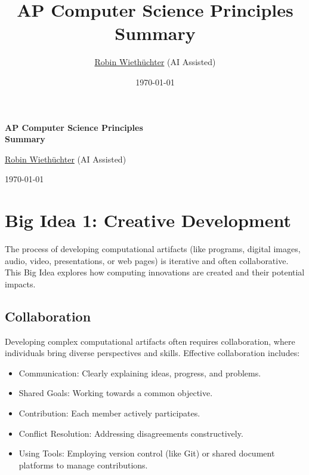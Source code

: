 \documentclass[11pt,oneside]{book}
\title{AP Computer Science Principles \\ Summary}
\author{\href{https://rowi.dev/}{Robin Wiethüchter} (AI Assisted)}
\date{\today}
\begin{document}
\begin{titlepage}
    \centering
    \vspace*{2cm}
    
    {\LARGE\bfseries AP Computer Science Principles \\ Summary\par}
    \vspace{1cm}
    {\large\href{https://rowi.dev/}{Robin Wiethüchter} (AI Assisted)\par}
    \vspace{1cm}
    {\large\today\par}
    
    \vspace{2cm}
    
\end{titlepage}

\frontmatter %
\tableofcontents

\mainmatter %

\chapter{Big Idea 1: Creative Development}
\label{chap:creative_development}

The process of developing computational artifacts (like programs, digital images, audio, video, presentations, or web pages) is iterative and often collaborative. This Big Idea explores how computing innovations are created and their potential impacts.

\section{Collaboration}
\label{sec:collaboration}
Developing complex computational artifacts often requires collaboration, where individuals bring diverse perspectives and skills. Effective collaboration includes:
\begin{itemize}
    \item Communication: Clearly explaining ideas, progress, and problems.
    \item Shared Goals: Working towards a common objective.
    \item Contribution: Each member actively participates.
    \item Conflict Resolution: Addressing disagreements constructively.
    \item Using Tools: Employing version control (like Git) or shared document platforms to manage contributions.
\end{itemize}
\end{document}

